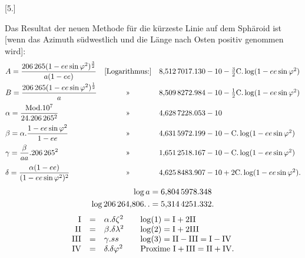 \clearpage
\noindent\makebox[12mm][l]{}\par\medskip
\begin{center}[5.]\end{center}
Das Resultat der neuen Methode für die kürzeste Linie auf dem Sphäroid
ist [wenn das Azimuth südwestlich und die Länge nach Osten positiv genommen wird]:
\begingroup\small
\[
\begin{array}{@{}lcl@{}}
\displaystyle A=\frac{206\,265(1-ee\sin\varphi^2)^{\frac32}}{a(1-ee)}
&\text{[Logarithmus:]}&8{,}512\,7017.130-10-\tfrac32\mathrm{C}.\log(1-ee\sin\varphi^2)\\[2ex]
\displaystyle B=\frac{206\,265(1-ee\sin\varphi^2)^{\frac12}}a
&\text{»}&8{,}509\,8272.984-10-\tfrac12\mathrm{C}.\log(1-ee\sin\varphi^2)\\[2ex]
\displaystyle\alpha=\frac{\mathrm{Mod}.10^7}{24.206\,265^2}
&\text{»}&4{,}628\,7228.053-10\\[2ex]
\displaystyle\beta=\alpha.\frac{1-ee\sin\varphi^2}{1-ee}
&\text{»}&4{,}631\,5972.199-10-\mathrm{C}.\log(1-ee\sin\varphi^2)\\[2ex]
\displaystyle\gamma=\frac\beta{aa}.206\,265^2
&\text{»}&1{,}651\,2518.167-10-\mathrm{C}.\log(1-ee\sin\varphi^2)\\[2ex]
\displaystyle\delta=\frac{\alpha(1-ee)}{(1-ee\sin\varphi^2)^2}
&\text{»}&4{,}625\,8483.907-10+2\mathrm{C}.\log(1-ee\sin\varphi^2).
\end{array}
\]
\endgroup
{}
\[
\begin{aligned}
\log a&=6{,}804\,5978.348\\
\log206\,264{,}806\ldotp\ldotp&=5{,}314\,4251.332.
\end{aligned}
\]
\[
\begin{array}{rcl@{\qquad}l}
\mathrm I&=&\alpha.\delta\zeta^2&\log(1)=\mathrm I+2\mathrm{II}\\
\mathrm{II}&=&\beta.\delta\lambda^2&\log(2)=\mathrm I+2\mathrm{III}\\
\mathrm{III}&=&\gamma.ss&\log(3)=\mathrm{II}-\mathrm{III}=\mathrm I-\mathrm{IV}\\
\mathrm{IV}&=&\delta.\delta\varphi^2&\text{Proxime }\mathrm I+\mathrm{III}=\mathrm{II}+\mathrm{IV}.
\end{array}
\]
